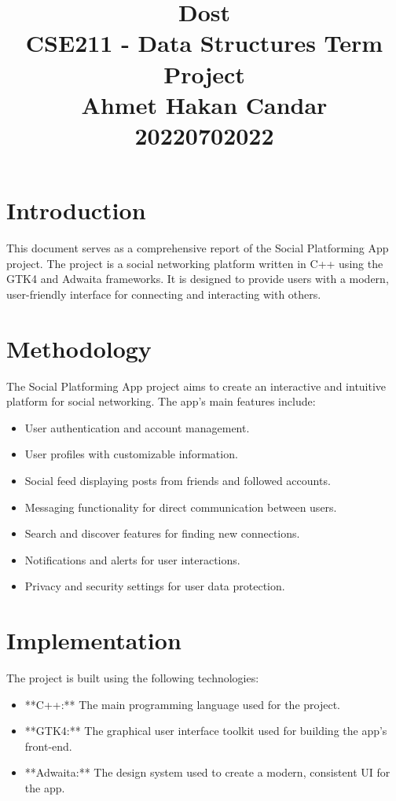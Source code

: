 \documentclass[twocolumn]{article}
\title{\vspace{-8ex}
    Dost \\ \vspace*{1ex}
  \large  CSE211 - Data Structures Term Project \\ \vspace*{1ex} Ahmet Hakan Candar \\ \vspace{1ex} 20220702022 \\ \vspace{-6ex}}
\date{}
\begin{document}
\maketitle


\section{Introduction}
This document serves as a comprehensive report of the Social Platforming App project. The project is a social networking platform written in C++ using the GTK4 and Adwaita frameworks. It is designed to provide users with a modern, user-friendly interface for connecting and interacting with others.

\section{Methodology}
The Social Platforming App project aims to create an interactive and intuitive platform for social networking. The app's main features include:
\begin{itemize}
    \item User authentication and account management.
    \item User profiles with customizable information.
    \item Social feed displaying posts from friends and followed accounts.
    \item Messaging functionality for direct communication between users.
    \item Search and discover features for finding new connections.
    \item Notifications and alerts for user interactions.
    \item Privacy and security settings for user data protection.
\end{itemize}

\section{Implementation}
The project is built using the following technologies:
\begin{itemize}
    \item **C++:** The main programming language used for the project.
    \item **GTK4:** The graphical user interface toolkit used for building the app's front-end.
    \item **Adwaita:** The design system used to create a modern, consistent UI for the app.
\end{itemize}
\end{document}
